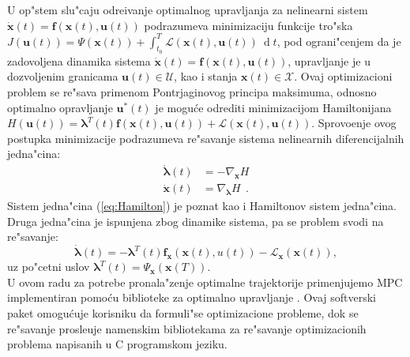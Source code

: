 \documentclass[a4paper,11pt]{article}
\theoremstyle{definition} \newtheorem{deff}{Definicija}[section]
\theoremstyle{definition} \newtheorem{prim}[deff]{Primer}
\theoremstyle{plain} \newtheorem{teor}[deff]{Teorema}
\newcommand{\vect}[1]{\boldsymbol{\mathbf{#1}}}
\begin{document}
	U op"stem slu"caju odre\dj ivanje optimalnog upravljanja za nelinearni sistem $\dot{\vect{x}}(t) = \vect{f}(\vect{x}(t), \vect{u}(t))$ podrazumeva minimizaciju funkcije tro"ska $J(\mathbf{u}(t)) = \Psi(\mathbf{x}(t)) + \int_{t_0}^{T}\mathcal{L}(\vect{x}(t), \vect{u}(t))~\operatorname{d}t$, pod ograni"cenjem da je zadovoljena dinamika sistema $\dot{\vect{x}}(t) = \vect{f}(\vect{x}(t), \vect{u}(t))$, upravljanje je u dozvoljenim granicama $\mathbf{u}(t)\in \mathbf{\mathcal{U}}$, kao i stanja $\mathbf{x}(t)\in \mathbf{\mathcal{X}}$.  Ovaj optimizacioni problem se re"sava primenom Pontrjaginovog principa maksimuma, odnosno optimalno opravljanje $\vect{u}^*(t)$ je mogu\'ce odrediti minimizacijom Hamiltonijana $H(\vect{u}(t)) = \vect{\lambda}^T(t)\vect{f}(\mathbf{x}(t), \vect{u}(t)) + \mathcal{L}(\mathbf{x}(t), \vect{u}(t))$. Sprovo\dj enje ovog postupka minimizacije podrazumeva re"savanje sistema nelinearnih diferencijalnih jedna"cina: 
	\begin{align}\label{eq:Hamilton}
		\dot{\vect{\lambda}}(t) &= -\nabla_{\vect{x}}H\\
		\dot{\vect{x}}(t) &= \nabla_{\vect{\lambda}}H~~.
	\end{align}
	Sistem jedna"cina (\ref{eq:Hamilton}) je poznat kao i Hamiltonov sistem jedna"cina. Druga jedna"cina je ispunjena zbog dinamike sistema, pa se problem svodi na re"savanje:
	\begin{equation}		\dot{\vect{\lambda}}(t) = -{\vect{\lambda}}^T(t)\vect{f}_{\mathbf{x}}(\mathbf{x}(t), u(t)) - \mathcal{L}_{\mathbf{x}}(\mathbf{x}(t)),
	\end{equation} 
	uz po"cetni uslov $\vect{\lambda}^T(t) = \Psi_{\mathbf{x}}(\mathbf{x}(T))$.\\
	
	U ovom radu za potrebe pronala"zenje optimalne trajektorije primenjujemo MPC implementiran pomo\'cu biblioteke za optimalno upravljanje \cite{CASADI}. Ovaj softverski paket omogu\'cuje korisniku da formuli"se optimizacione probleme, dok se re"savanje prosle\dj uje namenskim bibliotekama za re"savanje optimizacionih problema napisanih u C programskom jeziku. \\
	
\end{document}
